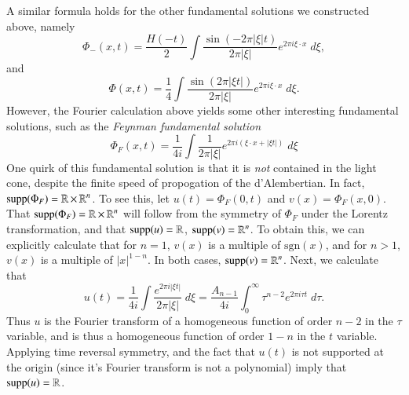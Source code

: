 \begin{example}
    A similar formula holds for the other fundamental solutions we constructed above, namely
    \[ \Phi_-(x,t) = \frac{H(-t)}{2} \int \frac{\sin(- 2 \pi |\xi| t)}{2 \pi |\xi|} e^{2 \pi i \xi \cdot x}\; d\xi, \]
    and
    \[ \Phi(x,t) = \frac{1}{4} \int \frac{\sin(2 \pi |\xi t|)}{2 \pi |\xi|} e^{2 \pi i \xi \cdot x}\; d\xi. \]
    However, the Fourier calculation above yields some other interesting fundamental solutions, such as the \emph{Feynman fundamental solution}
    \[ \Phi_F(x,t) = \frac{1}{4i} \int \frac{1}{2 \pi |\xi|} e^{2 \pi i (\xi \cdot x + |\xi t|)}\; d\xi  \]
    One quirk of this fundamental solution is that it is \emph{not} contained in the light cone, despite the finite speed of propogation of the d'Alembertian. In fact, $\text{supp}(\Phi_F) = \operatorname{\mathbb{R}} \times \operatorname{\mathbb{R}}^n$. To see this, let $u(t) = \Phi_F(0,t)$ and $v(x) = \Phi_F(x,0)$. That $\text{supp}(\Phi_F) = \operatorname{\mathbb{R}} \times \operatorname{\mathbb{R}}^n$ will follow from the symmetry of $\Phi_F$ under the Lorentz transformation, and that $\text{supp}(u) = \operatorname{\mathbb{R}}$, $\text{supp}(v) = \operatorname{\mathbb{R}}^n$. To obtain this, we can explicitly calculate that for $n = 1$, $v(x)$ is a multiple of $\text{sgn}(x)$, and for $n > 1$, $v(x)$ is a multiple of $|x|^{1-n}$. In both cases, $\text{supp}(v) = \operatorname{\mathbb{R}}^n$. Next, we calculate that
    \[ u(t) = \frac{1}{4i} \int \frac{e^{2 \pi i |\xi t|}}{2\pi|\xi|}\; d\xi = \frac{A_{n-1}}{4i} \int_0^\infty \tau^{n-2} e^{2 \pi i \tau t}\; d\tau. \]
    Thus $u$ is the Fourier transform of a homogeneous function of order $n-2$ in the $\tau$ variable, and is thus a homogeneous function of order $1-n$ in the $t$ variable. Applying time reversal symmetry, and the fact that $u(t)$ is not supported at the origin (since it's Fourier transform is not a polynomial) imply that $\text{supp}(u) = \operatorname{\mathbb{R}}$.


\end{example}
